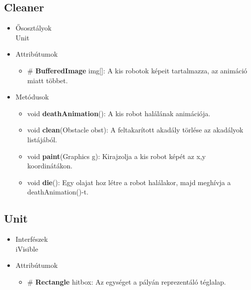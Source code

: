 \subsection{Cleaner}
\begin{itemize}
\item Ősosztályok\\
Unit
\item Attribútumok
    \begin{itemize}
        \item\# \textbf{BufferedImage} img[]: A kis robotok képeit tartalmazza, az animáció miatt többet.
    \end{itemize}
\item Metódusok
	\begin{itemize}
    	\item void \textbf{deathAnimation}(): A kis robot halálának animációja.
    	\item void \textbf{clean}(Obstacle obst): A feltakarított akadály törlése az akadályok listájából.
    	\item void \textbf{paint}(Graphics g): Kirajzolja a kis robot képét az x,y koordinátákon.
    	\item void \textbf{die}(): Egy olajat hoz létre a robot halálakor, majd meghívja a deathAnimation()-t.
	\end{itemize}
\end{itemize}


\subsection{Unit}
\begin{itemize}
\item Interfészek\\
iVisible
\item Attribútumok
	\begin{itemize}
		\item \# \textbf{Rectangle} hitbox: Az egységet a pályán reprezentáló téglalap.
	\end{itemize}
\end{itemize}

